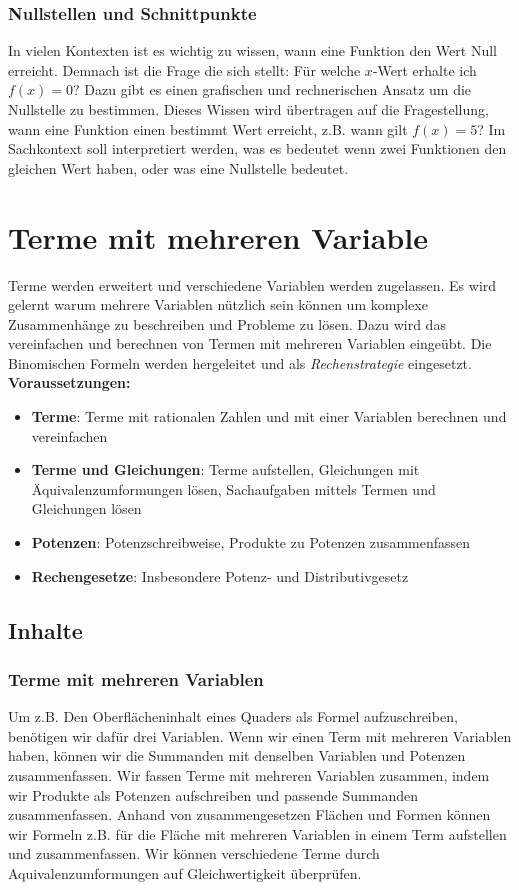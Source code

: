 \documentclass{article}
\begin{document}
\subsubsection*{Nullstellen und Schnittpunkte}
In vielen Kontexten ist es wichtig zu wissen, wann eine Funktion den Wert Null erreicht. Demnach ist die Frage die sich stellt: Für welche $x$-Wert erhalte ich $f(x) = 0$?
Dazu gibt es einen grafischen und rechnerischen Ansatz um die Nullstelle zu bestimmen. Dieses Wissen wird übertragen auf die Fragestellung, wann eine Funktion einen bestimmt Wert erreicht, z.B. wann gilt $f(x) = 5$?
Im Sachkontext soll interpretiert werden, was es bedeutet wenn zwei Funktionen den gleichen Wert haben, oder was eine Nullstelle bedeutet.
\newpage
\section{Terme mit mehreren Variable}
Terme werden erweitert und verschiedene Variablen werden zugelassen. Es wird gelernt warum mehrere Variablen nützlich sein können um komplexe Zusammenhänge zu beschreiben und Probleme zu lösen. Dazu wird das vereinfachen und berechnen von Termen mit mehreren Variablen eingeübt.
Die Binomischen Formeln werden hergeleitet und als \textit{Rechenstrategie} eingesetzt.\\
\textbf{Voraussetzungen: }
\begin{itemize}
    \item \textbf{Terme}: Terme mit rationalen Zahlen und mit einer Variablen berechnen und vereinfachen
    \item \textbf{Terme und Gleichungen}: Terme aufstellen, Gleichungen mit Äquivalenzumformungen lösen, Sachaufgaben mittels Termen und Gleichungen lösen
    \item \textbf{Potenzen}: Potenzschreibweise, Produkte zu Potenzen zusammenfassen
    \item \textbf{Rechengesetze}: Insbesondere Potenz- und Distributivgesetz
\end{itemize}
\subsection{Inhalte}
\subsubsection*{Terme mit mehreren Variablen}
Um z.B. Den Oberflächeninhalt eines Quaders als Formel aufzuschreiben, benötigen wir dafür drei Variablen.
Wenn wir einen Term mit mehreren Variablen haben, können wir die Summanden mit denselben Variablen und Potenzen zusammenfassen.
Wir fassen Terme mit mehreren Variablen zusammen, indem wir Produkte als Potenzen aufschreiben und passende Summanden zusammenfassen.
Anhand von zusammengesetzen Flächen und Formen können wir Formeln z.B. für die Fläche mit mehreren Variablen in einem Term aufstellen und zusammenfassen.
Wir können verschiedene Terme durch Aquivalenzumformungen auf Gleichwertigkeit überprüfen.
\end{document}
